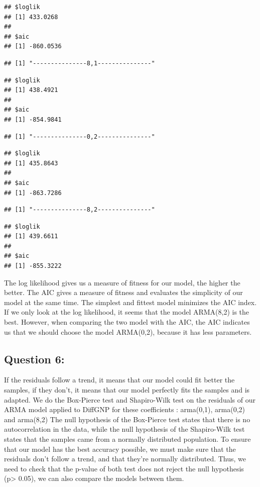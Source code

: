 \documentclass[]{article}
\begin{document}
\begin{verbatim}
## $loglik
## [1] 433.0268
## 
## $aic
## [1] -860.0536
\end{verbatim}

\begin{verbatim}
## [1] "---------------8,1---------------"
\end{verbatim}

\begin{verbatim}
## $loglik
## [1] 438.4921
## 
## $aic
## [1] -854.9841
\end{verbatim}

\begin{verbatim}
## [1] "---------------0,2---------------"
\end{verbatim}

\begin{verbatim}
## $loglik
## [1] 435.8643
## 
## $aic
## [1] -863.7286
\end{verbatim}

\begin{verbatim}
## [1] "---------------8,2---------------"
\end{verbatim}

\begin{verbatim}
## $loglik
## [1] 439.6611
## 
## $aic
## [1] -855.3222
\end{verbatim}

The log likelihood gives us a measure of fitness for our model, the
higher the better. The AIC gives a measure of fitness and evaluates the
simplicity of our model at the same time. The simplest and fittest model
minimizes the AIC index. If we only look at the log likelihood, it seems
that the model ARMA(8,2) is the best. However, when comparing the two
model with the AIC, the AIC indicates us that we should choose the model
ARMA(0,2), because it has less parameters.

\subsection{Question 6:}\label{question-6-1}

If the residuals follow a trend, it means that our model could fit
better the samples, if they don't, it means that our model perfectly
fits the samples and is adapted. We do the Box-Pierce test and
Shapiro-Wilk test on the residuals of our ARMA model applied to DiffGNP
for these coefficients : arma(0,1), arma(0,2) and arma(8,2) The null
hypothesis of the Box-Pierce test states that there is no
autocorrelation in the data, while the null hypothesis of the
Shapiro-Wilk test states that the samples came from a normally
distributed population. To ensure that our model has the best accuracy
possible, we must make sure that the residuals don't follow a trend, and
that they're normally distributed. Thus, we need to check that the
p-value of both test does not reject the null hypothesis
(p\textgreater{} 0.05), we can also compare the models between them.
\end{document}
